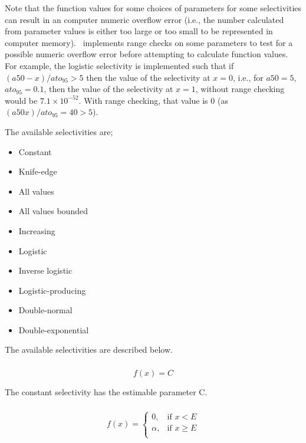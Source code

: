 Note that the function values for some choices of parameters for some selectivities can result in an computer numeric overflow error (i.e., the number calculated from parameter values is either too large or too small to be represented in computer memory). \SPM\ implements range checks on some parameters to test for a possible numeric overflow error before attempting to calculate function values. For example, the logistic selectivity is implemented such that if $(a50-x)/ato_95 > 5$ then the value of the selectivity at $x=0$, i.e., for $a50=5$, $ato_95=0.1$, then the value of the selectivity at $x=1$, without range checking would be $7.1 \times 10^{-52}$. With range checking, that value is $0$ (as $(a50 x)/ato_95=40 > 5$).

The available selectivities are;

\begin{itemize}
  \item Constant
  \item Knife-edge
  \item All values
  \item All values bounded
  \item Increasing
  \item Logistic
	\item Inverse logistic
  \item Logistic-producing
  \item Double-normal
  \item Double-exponential
\end{itemize}

The available selectivities are described below.

\subsubsection[Constant]{}

\begin{equation}
f(x)=C
\end{equation}

The constant selectivity has the estimable parameter C. 

\subsubsection[Knife-edge]{}

\begin{equation}
f(x)= \begin{cases}
  0, & \text{if $x < E$} \\
  \alpha, & \text{if $x \ge E$}\\ 
  \end{cases} 
\end{equation}

